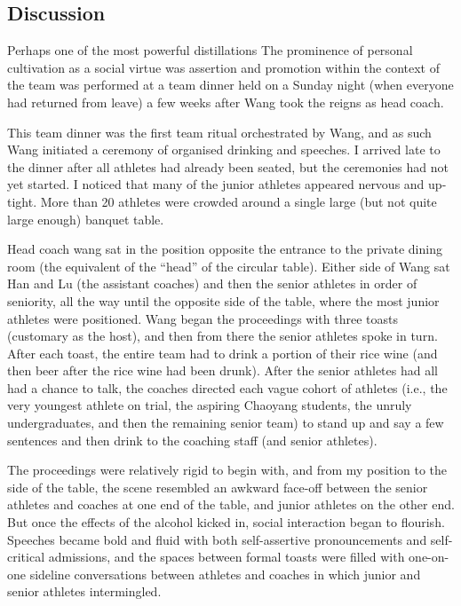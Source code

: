 \begin{CJK}{UTF8}{gbsn}
\section{Discussion}


Perhaps one of the most powerful distillations The prominence of personal cultivation as a social virtue was assertion and promotion within the context of the team was performed at a team dinner held on a Sunday night (when everyone had returned from leave) a few weeks after Wang took the reigns as head coach.

This team dinner was the first team ritual orchestrated by Wang, and as such Wang initiated a ceremony of organised drinking and speeches.
I arrived late to the dinner after all athletes had already been seated, but the ceremonies had not yet started.  I noticed that many of the junior athletes appeared nervous and up-tight. More than 20 athletes were crowded around a single large (but not quite large enough) banquet table.

Head coach wang sat in the position opposite the entrance to the private dining room (the equivalent of the ``head'' of the circular table).  Either side of Wang sat Han and Lu (the assistant coaches) and then the senior athletes in order of seniority, all the way until the opposite side of the table, where the most junior athletes were positioned.  Wang began the proceedings with three toasts (customary as the host), and then from there the senior athletes spoke in turn.  After each toast, the entire team had to drink a portion of their rice wine (and then beer after the rice wine had been drunk). After the senior athletes had all had a chance to talk, the coaches directed each vague cohort of athletes (i.e., the very youngest athlete on trial, the aspiring Chaoyang students, the unruly undergraduates, and then the remaining senior team) to stand up and say a few sentences and then drink to the coaching staff (and senior athletes).

The proceedings were relatively rigid to begin with, and from my position to the side of the table, the scene resembled an awkward face-off between the senior athletes and coaches at one end of the table, and junior athletes on the other end.  But once the effects of the alcohol kicked in, social interaction began to flourish. Speeches became bold and fluid with both self-assertive pronouncements and self-critical admissions, and the spaces between formal toasts were filled with one-on-one sideline conversations between athletes and coaches in which junior and senior athletes intermingled.


\end{CJK}
